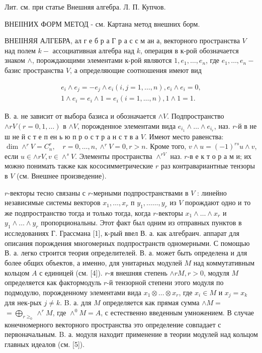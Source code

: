 \documentclass[10pt]{article}
\begin{document}
Лит. см. при статье Внешняя алгебра. Л. П. Купчов.



ВНЕІІНИХ ФОРМ МЕТОД - см. Картана метод внешних борм.



ВНЕІІНЯЯ АЛГЕБРА, ал г е б р а $Г$ р а с с м ан а, векторного пространства $V$ над полем $k-$ ассоциативная алгебра над $k$, операция в к-рой обозначается знаком $\wedge$, порождающими элементами к-рой являются $1, e_{1}, \ldots, e_{n}$, где $e_{1}, \ldots, e_{n}-$ базис пространства $V$, а определяющие соотношения имеют вид



\[

\begin{gathered}

e_{i} \wedge e_{j}=-e_{j} \wedge e_{i}(i, j=1, \ldots, n), e_{i} \wedge e_{i}=0, \\

1 \wedge e_{i}=e_{i} \wedge 1=e_{i}(i=1, \ldots, n), 1 \wedge 1=1 .

\end{gathered}

\]



В. а. не зависит от выбора базиса и обозначается $\wedge V$. Подпространство $\wedge r V(r=0,1, \ldots)$ в $\wedge V$, порожденное элементами вида $e_{i_{1}} \wedge \ldots \wedge e_{i_{r}}$, наз. $r$-й в не ш не й с т е п ен ь ю п р о с т р а н с т в а $V$. Имеют место равенства: $\operatorname{dim} \wedge^{r} V=C_{n}^{r}, \quad r=0, \ldots, n, \wedge^{r} V=0, r>n$. Кроме того, $v \wedge u=(-1)^{r s} u \wedge v$, если $u \in \wedge r V, v \in \wedge^{s} V$. Элементы пространства $\wedge^{r V}$ наз. $r$-в е к т о р а м и; их можно понимать также как кососимметрические $r$ раз контравариантные тензоры в $V$ (см. Внешнее произведение).



$r$-векторы тесно связаны с $r$-мерными подпространствами в $V$ : линейно независимые системы векторов $x_{1}, \ldots, x_{r}$ п $y_{1}, \ldots \ldots, y_{r}$ из $V$ порождают одно и то же подпространство тогда и только тогда, когда $r$-векторы $x_{1} \wedge \ldots \wedge x_{r}$ и $y_{1} \wedge \ldots \wedge y_{r}$ пропорциональны. Этот факт был одним из отправных пунктов в исследованиях Г. Грассмана [1], к-рый ввел В. а. как алгебраич. аппарат для описания порождения многомерных подпространств одномерными. С помощью В. а. легко строится теория определителей. В. а. может быть определена и для более общих объектов, а именно, для унитарных модулей $M$ над коммутативным кольцом $A$ с единицей (см. [4]). $r$-я внешняя степень $\wedge r M, r>0$, модуля $M$ определяется как фактормодуль $r$-й тензорной степени этого модуля по подмодулю, порожденному элементами вида $x_{1} \otimes \ldots \otimes x_{r}$, где $x_{i} \in M$ и $x_{j}=x_{k}$ для нек-рых $j \neq k$. B. а. для $M$ определяется как прямая сумма $\wedge M=$ $=\bigoplus_{r \geqslant_{0}} \wedge^{r} M$, где $\wedge^{0} M=A$, с естественно введенным умножением. В случае конечномерного векторного пространства это определение совпадает с первоначальным. B. а. модуля находит применение в теории модулей над кольцом главных идеалов (см. [5]).
\end{document}
